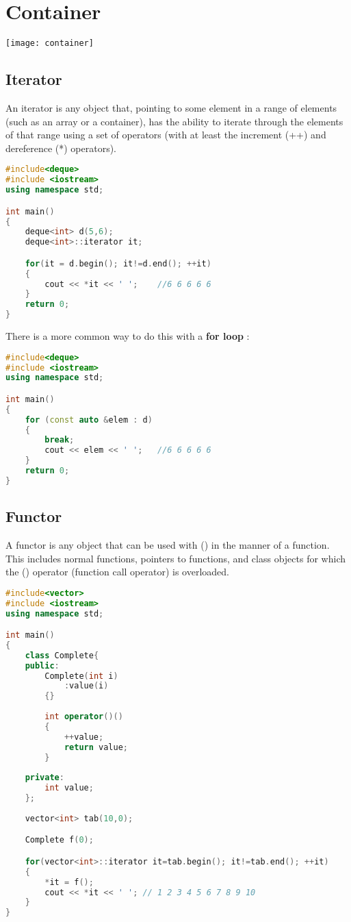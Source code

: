 \documentclass[a4paper, 12pt, titlepage]{scrartcl} %
\begin{document}
\section{Container}
\centering\texttt{[image: container]}

\subsection{Iterator}
An iterator is any object that, pointing to some element in a range of elements (such as an array or a container), has the ability to iterate through the elements of that range using a set of operators (with at least the increment (++) and dereference (*) operators).

\begin{lstlisting}[language=C++]
#include<deque>
#include <iostream>
using namespace std;

int main()
{
    deque<int> d(5,6);        
    deque<int>::iterator it;  

    for(it = d.begin(); it!=d.end(); ++it)
    {
        cout << *it << ' ';    //6 6 6 6 6
    }
    return 0;
}
\end{lstlisting} \vspace{5mm}

There is a more common way to do this with a \textbf{for loop} :

\begin{lstlisting}[language=C++]
#include<deque>
#include <iostream>
using namespace std;

int main()
{
    for (const auto &elem : d)
    {
        break;
        cout << elem << ' ';   //6 6 6 6 6
    }
    return 0;
}
\end{lstlisting} \vspace{5mm}


\subsection{Functor}
A functor is any object that can be used with () in the manner of a function. \\
This includes normal functions, pointers to functions, and class objects for which the () operator (function call operator) is overloaded.

\begin{lstlisting}[language=C++]
#include<vector>
#include <iostream>
using namespace std;

int main()
{
    class Complete{
    public:
        Complete(int i)
            :value(i)
        {}
    
        int operator()()
        {
            ++value;
            return value;
        }
    
    private:
        int value;
    };
    
    vector<int> tab(10,0);

    Complete f(0);       

    for(vector<int>::iterator it=tab.begin(); it!=tab.end(); ++it)
    {
        *it = f();
        cout << *it << ' '; // 1 2 3 4 5 6 7 8 9 10
    }
}
\end{lstlisting} \vspace{5mm}
\end{document}
